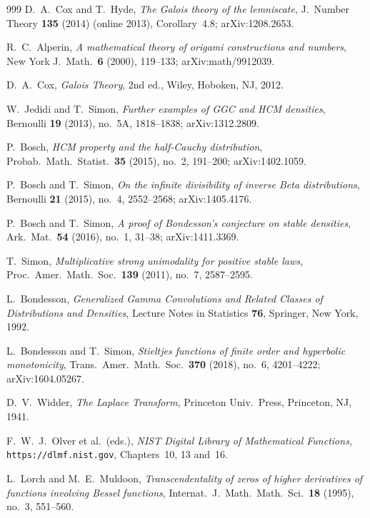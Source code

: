\documentclass[11pt]{amsart}
\theoremstyle{definition}
\theoremstyle{remark}
\begin{document}
\begin{thebibliography}{999}
D.~A.~Cox and T.~Hyde,
\emph{The Galois theory of the lemniscate},
J.\ Number Theory \textbf{135} (2014) (online 2013), Corollary~4.8; arXiv:1208.2653.

R.~C.~Alperin,
\emph{A mathematical theory of origami constructions and numbers},
New York J.\ Math.\ \textbf{6} (2000), 119--133; arXiv:math/9912039.

D.~A.~Cox,
\emph{Galois Theory}, 2nd ed.,
Wiley, Hoboken, NJ, 2012.

W.~Jedidi and T.~Simon,
\emph{Further examples of GGC and HCM densities},
Bernoulli \textbf{19} (2013), no.~5A, 1818--1838; arXiv:1312.2809.

P.~Bosch,
\emph{HCM property and the half-Cauchy distribution},
Probab.\ Math.\ Statist.\ \textbf{35} (2015), no.~2, 191--200; arXiv:1402.1059.

P.~Bosch and T.~Simon,
\emph{On the infinite divisibility of inverse Beta distributions},
Bernoulli \textbf{21} (2015), no.~4, 2552--2568; arXiv:1405.4176.

P.~Bosch and T.~Simon,
\emph{A proof of Bondesson's conjecture on stable densities},
Ark.\ Mat.\ \textbf{54} (2016), no.~1, 31--38; arXiv:1411.3369.

T.~Simon,
\emph{Multiplicative strong unimodality for positive stable laws},
Proc.\ Amer.\ Math.\ Soc.\ \textbf{139} (2011), no.~7, 2587--2595.

L.~Bondesson,
\emph{Generalized Gamma Convolutions and Related Classes of Distributions and
Densities}, Lecture Notes in Statistics \textbf{76}, Springer, New York, 1992.

L.~Bondesson and T.~Simon,
\emph{Stieltjes functions of finite order and hyperbolic monotonicity},
Trans.\ Amer.\ Math.\ Soc.\ \textbf{370} (2018), no.~6, 4201--4222; arXiv:1604.05267.

D.~V.~Widder,
\emph{The Laplace Transform},
Princeton Univ.\ Press, Princeton, NJ, 1941.

F.~W.~J.~Olver et al.\ (eds.),
\emph{NIST Digital Library of Mathematical Functions},
\texttt{https://dlmf.nist.gov}, Chapters~10, 13 and~16.

L.~Lorch and M.~E.~Muldoon,
\emph{Transcendentality of zeros of higher derivatives of functions involving
Bessel functions},
Internat.\ J.\ Math.\ Math.\ Sci.\ \textbf{18} (1995), no.~3, 551--560.


\end{thebibliography}
\end{document}
